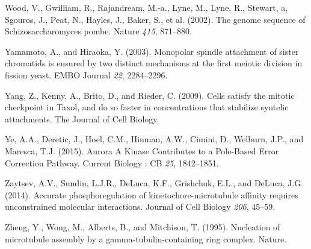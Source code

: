 \documentclass[12pt,a4paper,twoside,openright]{book}
\begin{document}
\hypertarget{ref-Wood2002a}{}
Wood, V., Gwilliam, R., Rajandream, M.-a., Lyne, M., Lyne, R., Stewart,
a, Sgouros, J., Peat, N., Hayles, J., Baker, S., et al. (2002). The
genome sequence of Schizosaccharomyces pombe. Nature \emph{415},
871--880.

\hypertarget{ref-Yamamoto2003}{}
Yamamoto, A., and Hiraoka, Y. (2003). Monopolar spindle attachment of
sister chromatids is ensured by two distinct mechanisms at the first
meiotic division in fission yeast. EMBO Journal \emph{22}, 2284--2296.

\hypertarget{ref-Yang2009}{}
Yang, Z., Kenny, A., Brito, D., and Rieder, C. (2009). Cells satisfy the
mitotic checkpoint in Taxol, and do so faster in concentrations that
stabilize syntelic attachments. The Journal of Cell Biology.

\hypertarget{ref-Ye2015}{}
Ye, A.A., Deretic, J., Hoel, C.M., Hinman, A.W., Cimini, D., Welburn,
J.P., and Maresca, T.J. (2015). Aurora A Kinase Contributes to a
Pole-Based Error Correction Pathway. Current Biology : CB \emph{25},
1842--1851.

\hypertarget{ref-Zaytsev2014}{}
Zaytsev, A.V., Sundin, L.J.R., DeLuca, K.F., Grishchuk, E.L., and
DeLuca, J.G. (2014). Accurate phosphoregulation of
kinetochore-microtubule affinity requires unconstrained molecular
interactions. Journal of Cell Biology \emph{206}, 45--59.

\hypertarget{ref-Zheng1995}{}
Zheng, Y., Wong, M., Alberts, B., and Mitchison, T. (1995). Nucleation
of microtubule assembly by a gamma-tubulin-containing ring complex.
Nature.
\end{document}
